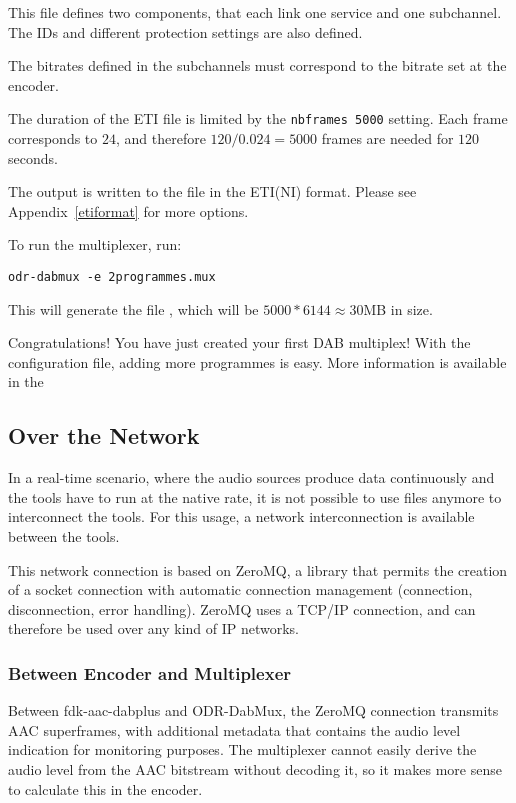 This file defines two components, that each link one service and one
subchannel. The IDs and different protection settings are also defined.

The bitrates defined in the subchannels must correspond to the bitrate set at the encoder.

The duration of the ETI file is limited by the \lstinline{nbframes 5000} setting. Each frame
corresponds to $24$\ms, and therefore $120 / 0.024 = 5000$ frames are needed
for $120$ seconds.

The output is written to the file  in the ETI(NI) format. Please
see Appendix~\ref{etiformat} for more options.

To run the multiplexer, run:
\begin{lstlisting}
odr-dabmux -e 2programmes.mux
\end{lstlisting}

This will generate the file , which will be $5000 * 6144
\approx 30$\si{MB} in size.

Congratulations! You have just created your first DAB multiplex! With the configuration file,
adding more programmes is easy. More information is available in the 

\subsection{Over the Network}
In a real-time scenario, where the audio sources produce data continuously and the tools have to
run at the native rate, it is not possible to use files anymore to interconnect the tools. For this
usage, a network interconnection is available between the tools.

This network connection is based on ZeroMQ, a library that permits the creation of a socket
connection with automatic connection management (connection, disconnection, error handling).
ZeroMQ uses a TCP/IP connection, and can therefore be used over any kind of IP networks.

\subsubsection{Between Encoder and Multiplexer}

Between fdk-aac-dabplus and ODR-DabMux, the ZeroMQ connection transmits AAC superframes, with
additional metadata that contains the audio level indication for monitoring purposes. The
multiplexer cannot easily derive the audio level from the AAC bitstream without decoding it, so it
makes more sense to calculate this in the encoder.

